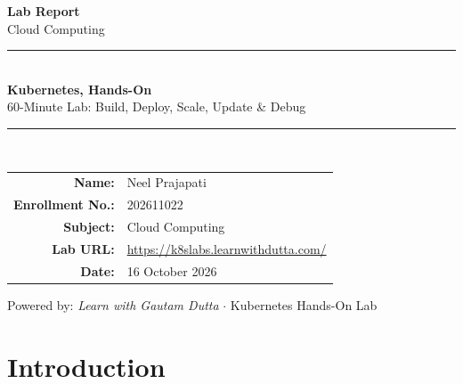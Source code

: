 \documentclass[12pt,a4paper]{report}
\begin{document}
\begin{titlepage}
  \centering
  \vspace*{1.5cm}

  {\Huge\bfseries\color{k8sblue} Lab Report}\\[0.5cm]
  {\large\color{gray} Cloud Computing}\\[2cm]

  \rule{\linewidth}{2pt}\\[0.5cm]
  {\LARGE\bfseries Kubernetes, Hands-On}\\[0.3cm]
  {\large\color{k8sgreen} 60-Minute Lab: Build, Deploy, Scale, Update \& Debug}\\[0.5cm]
  \rule{\linewidth}{2pt}\\[2cm]

  \begin{tabular}{rl}
    \textbf{Name:}           & Neel Prajapati \\[6pt]
    \textbf{Enrollment No.:} & 202611022 \\[6pt]
    \textbf{Subject:}        & Cloud Computing \\[6pt]
    \textbf{Lab URL:}        & \url{https://k8slabs.learnwithdutta.com/} \\[6pt]
    \textbf{Date:}           & 16 October 2026 \\
  \end{tabular}

  \vfill
  {\small Powered by: \textit{Learn with Gautam Dutta} $\cdot$ Kubernetes Hands-On Lab}
\end{titlepage}

\tableofcontents
\clearpage

\chapter*{Introduction}
\end{document}
